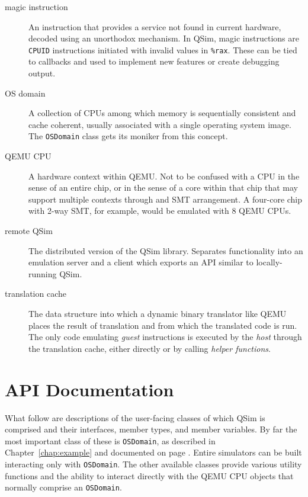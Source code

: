 \documentclass[letterpaper, 10pt]{book}
\begin{document}
\begin{description}
\item[magic instruction]
An instruction that provides a service not found in current hardware,
decoded using an unorthodox mechanism. In QSim, magic instructions are
\texttt{CPUID} instructions initiated with invalid values in \texttt{\%rax}.
These can be tied to callbacks and used to implement new features or create
debugging output.

\item[OS domain]
A collection of CPUs among which memory is sequentially consistent and cache
coherent, usually associated with a single operating system image. The 
\texttt{OSDomain} class gets its moniker from this concept.

\item[QEMU CPU]
A hardware context within QEMU. Not to be confused with a CPU in the sense
of an entire chip, or in the sense of a core within that chip that may 
support multiple contexts through and SMT arrangement. A four-core chip with
2-way SMT, for example, would be emulated with 8 QEMU CPUs.

\item[remote QSim]
The distributed version of the QSim library. Separates functionality into an
emulation server and a client which exports an API similar to locally-running
QSim.

\item[translation cache] 
The data structure into which a dynamic binary translator like QEMU places the
result of translation and from which the translated code is run. The only
code emulating \emph{guest} instructions is executed by the \emph{host}
through the translation cache, either directly or by calling 
\emph{helper functions}.
\end{description}

\appendix
\chapter{API Documentation}

What follow are descriptions of the user-facing classes of which QSim is 
comprised and their interfaces, member types, and member variables. By far
the most important class of these is \texttt{OSDomain}, as described in
Chapter~\ref{chap:example} and documented on page \pageref{class:OSDomain}.
Entire simulators can be built interacting only with \texttt{OSDomain}. The
other available classes provide various utility functions and the ability to
interact directly with the QEMU CPU objects that normally comprise an
\texttt{OSDomain}.
\end{document}
